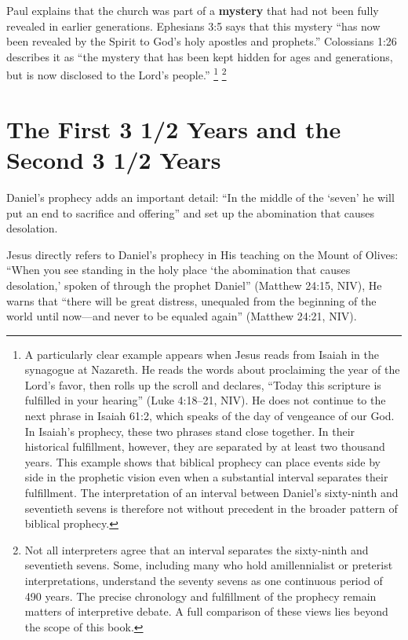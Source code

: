 Paul explains that the church was part of a \textbf{mystery} that had not been fully revealed in earlier generations. Ephesians 3:5 says that this mystery ``has now been revealed by the Spirit to God's holy apostles and prophets.'' Colossians 1:26 describes it as ``the mystery that has been kept hidden for ages and generations, but is now disclosed to the Lord's people.''%
\footnote{A particularly clear example appears when Jesus reads from Isaiah in the synagogue at Nazareth. He reads the words about proclaiming the year of the Lord's favor, then rolls up the scroll and declares, ``Today this scripture is fulfilled in your hearing'' (Luke 4:18--21, NIV). He does not continue to the next phrase in Isaiah 61:2, which speaks of the day of vengeance of our God. In Isaiah's prophecy, these two phrases stand close together. In their historical fulfillment, however, they are separated by at least two thousand years. This example shows that biblical prophecy can place events side by side in the prophetic vision even when a substantial interval separates their fulfillment. The interpretation of an interval between Daniel's sixty-ninth and seventieth sevens is therefore not without precedent in the broader pattern of biblical prophecy.}%
\footnote{Not all interpreters agree that an interval separates the sixty-ninth and seventieth sevens. Some, including many who hold amillennialist or preterist interpretations, understand the seventy sevens as one continuous period of 490 years. The precise chronology and fulfillment of the prophecy remain matters of interpretive debate. A full comparison of these views lies beyond the scope of this book.}

\section*{The First 3 1/2 Years and the Second 3 1/2 Years}

Daniel's prophecy adds an important detail: ``In the middle of the `seven' he will put an end to sacrifice and offering'' and set up the abomination that causes desolation.

Jesus directly refers to Daniel's prophecy in His teaching on the Mount of Olives: ``When you see standing in the holy place `the abomination that causes desolation,' spoken of through the prophet Daniel'' (Matthew 24:15, NIV), He warns that ``there will be great distress, unequaled from the beginning of the world until now---and never to be equaled again'' (Matthew 24:21, NIV).

